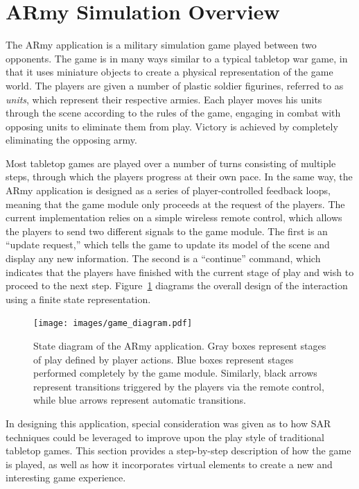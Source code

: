 \documentclass{thesis}
\begin{document}
\section{ARmy Simulation Overview}

The ARmy application is a military simulation game played between two opponents. The game is in many ways similar to a typical tabletop war game, in that it uses miniature objects to create a physical representation of the game world. The players are given a number of plastic soldier figurines, referred to as \emph{units}, which represent their respective armies. Each player moves his units through the scene according to the rules of the game, engaging in combat with opposing units to eliminate them from play. Victory is achieved by completely eliminating the opposing army.

Most tabletop games are played over a number of turns consisting of multiple steps, through which the players progress at their own pace. In the same way, the ARmy application is designed as a series of player-controlled feedback loops, meaning that the game module only proceeds at the request of the players. The current implementation relies on a simple wireless remote control, which allows the players to send two different signals to the game module. The first is an ``update request,'' which tells the game to update its model of the scene and display any new information. The second is a ``continue'' command, which indicates that the players have finished with the current stage of play and wish to proceed to the next step. Figure~\ref{FIGURE:ARmyDiagram} diagrams the overall design of the interaction using a finite state representation.

\begin{figure}[p]
\begin{center}
\texttt{[image: images/game\_diagram.pdf]}
\end{center}
\caption[ARmy Application State Diagram]{\small{State diagram of the ARmy application. Gray boxes represent stages of play defined by player actions. Blue boxes represent stages performed completely by the game module. Similarly, black arrows represent transitions triggered by the players via the remote control, while blue arrows represent automatic transitions.}}
\label{FIGURE:ARmyDiagram}
\end{figure}

In designing this application, special consideration was given as to how SAR techniques could be leveraged to improve upon the play style of traditional tabletop games. This section provides a step-by-step description of how the game is played, as well as how it incorporates virtual elements to create a new and interesting game experience.
\end{document}
